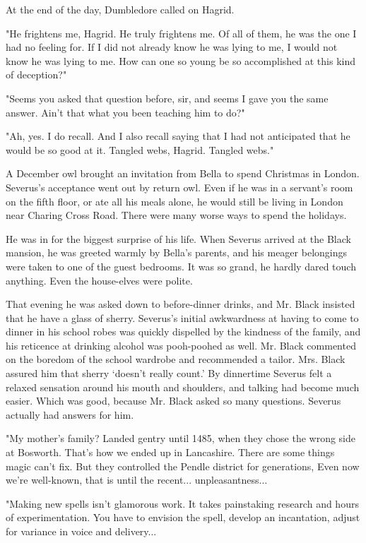 At the end of the day, Dumbledore called on Hagrid.

"He frightens me, Hagrid. He truly frightens me. Of all of them, he was the one I had no feeling for. If I did not already know he was lying to me, I would not know he was lying to me. How can one so young be so accomplished at this kind of deception?"

"Seems you asked that question before, sir, and seems I gave you the same answer. Ain't that what you been teaching him to do?"

"Ah, yes. I do recall. And I also recall saying that I had not anticipated that he would be so good at it. Tangled webs, Hagrid. Tangled webs."

A December owl brought an invitation from Bella to spend Christmas in London. Severus's acceptance went out by return owl. Even if he was in a servant's room on the fifth floor, or ate all his meals alone, he would still be living in London near Charing Cross Road. There were many worse ways to spend the holidays.

He was in for the biggest surprise of his life. When Severus arrived at the Black mansion, he was greeted warmly by Bella's parents, and his meager belongings were taken to one of the guest bedrooms. It was so grand, he hardly dared touch anything. Even the house-elves were polite.

That evening he was asked down to before-dinner drinks, and Mr. Black insisted that he have a glass of sherry. Severus's initial awkwardness at having to come to dinner in his school robes was quickly dispelled by the kindness of the family, and his reticence at drinking alcohol was pooh-poohed as well. Mr. Black commented on the boredom of the school wardrobe and recommended a tailor. Mrs. Black assured him that sherry `doesn't really count.' By dinnertime Severus felt a relaxed sensation around his mouth and shoulders, and talking had become much easier. Which was good, because Mr. Black asked so many questions. Severus actually had answers for him.

"My mother's family? Landed gentry until 1485, when they chose the wrong side at Bosworth. That's how we ended up in Lancashire. There are some things magic can't fix. But they controlled the Pendle district for generations, Even now we're well-known, that is until the recent... unpleasantness...

"Making new spells isn't glamorous work. It takes painstaking research and hours of experimentation. You have to envision the spell, develop an incantation, adjust for variance in voice and delivery...

